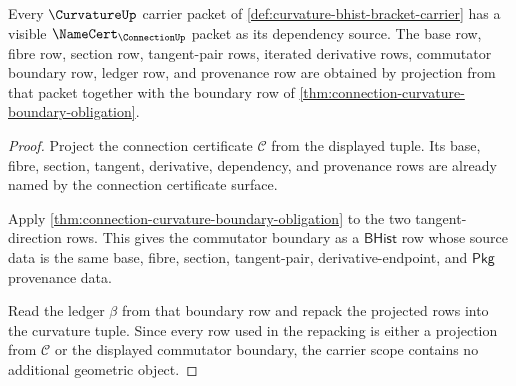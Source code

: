 \begin{theorem}
\label{thm:curvature-connection-carrier-scope}
Every $\CurvatureUp$ carrier packet of \autoref{def:curvature-bhist-bracket-carrier} has a visible $\NameCert_{\ConnectionUp}$ packet as its dependency source. The base row, fibre row, section row, tangent-pair rows, iterated derivative rows, commutator boundary row, ledger row, and provenance row are obtained by projection from that packet together with the boundary row of \autoref{thm:connection-curvature-boundary-obligation}.
\end{theorem}
\begin{proof}
Project the connection certificate $\mathcal{C}$ from the displayed tuple. Its base, fibre, section, tangent, derivative, dependency, and provenance rows are already named by the connection certificate surface.

Apply \autoref{thm:connection-curvature-boundary-obligation} to the two tangent-direction rows. This gives the commutator boundary as a $\mathsf{BHist}$ row whose source data is the same base, fibre, section, tangent-pair, derivative-endpoint, and $\mathsf{Pkg}$ provenance data.

Read the ledger $\beta$ from that boundary row and repack the projected rows into the curvature tuple. Since every row used in the repacking is either a projection from $\mathcal{C}$ or the displayed commutator boundary, the carrier scope contains no additional geometric object.
\end{proof}

